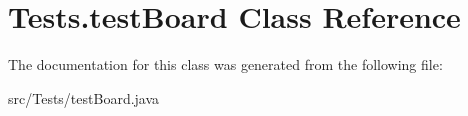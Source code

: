 \hypertarget{class_tests_1_1test_board}{}\section{Tests.\+test\+Board Class Reference}
\label{class_tests_1_1test_board}


The documentation for this class was generated from the following file\+:\begin{DoxyCompactItemize}
\item 
src/\+Tests/test\+Board.\+java\end{DoxyCompactItemize}
